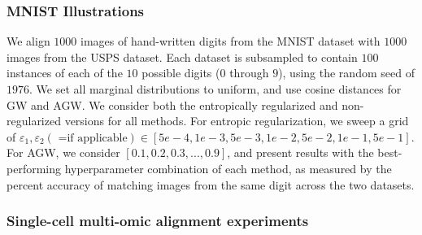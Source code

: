 \subsubsection{MNIST Illustrations} We align $1000$ images of hand-written digits from
the MNIST dataset with $1000$ images from the USPS dataset. Each dataset is subsampled to
contain $100$ instances of each of the $10$ possible digits ($0$ through $9$),
using the random seed of $1976$. We set all marginal distributions to uniform,
and use cosine distances for GW and AGW. We consider both the entropically regularized and
non-regularized versions for all methods. For entropic regularization, we sweep a grid of
$\varepsilon_1, \varepsilon_2 (\textrm{ =if applicable}) \in [5e-4, 1e-3, 5e-3, 1e-2, 5e-2, 1e-1, 5e-1]$.
For AGW, we consider $[0.1, 0.2, 0.3, ..., 0.9]$, and present results with the best-performing
hyperparameter combination of each method, as measured by the percent accuracy of matching images
from the same digit across the two datasets.

\subsubsection{Single-cell multi-omic alignment experiments}


